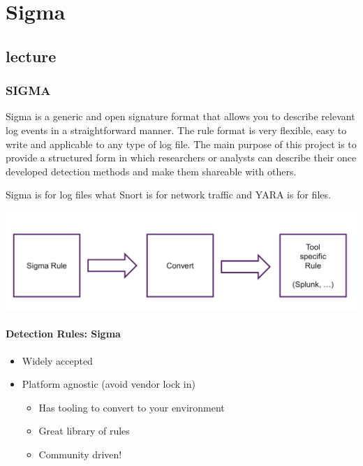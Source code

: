 
\chapter{Sigma}
\newpage

\section{lecture}

\subsection{SIGMA}
Sigma is a generic and open signature format that allows you to describe relevant log events in a straightforward manner. The rule format is very flexible, easy to write and applicable to any type of log file. The main purpose of this project is to provide a structured form in which researchers or analysts can describe their once developed detection methods and make them shareable with others.

Sigma is for log files what Snort is for network traffic and YARA is for files.

\begin{center}
\includegraphics[width=\textwidth]{resources/12-sigma-01.png}
\end{center}

\subsubsection{Detection Rules: Sigma}
\begin{itemize}
  \item Widely accepted
  \item Platform agnostic (avoid vendor lock in)
  \begin{itemize}
    \item Has tooling to convert to your environment
    \item Great library of rules
    \item Community driven!
  \end{itemize}
\end{itemize}

